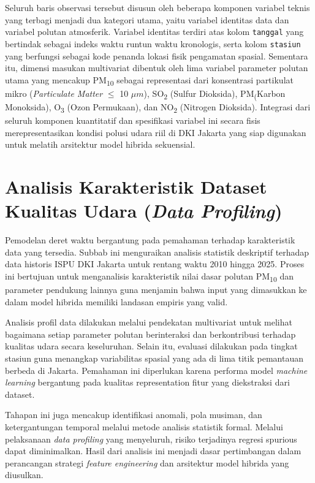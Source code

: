 Seluruh baris observasi tersebut disusun oleh beberapa komponen variabel teknis yang terbagi menjadi dua kategori utama, yaitu variabel identitas data dan variabel polutan atmosferik. Variabel identitas terdiri atas kolom \texttt{tanggal} yang bertindak sebagai indeks waktu runtun waktu kronologis, serta kolom \texttt{stasiun} yang berfungsi sebagai kode penanda lokasi fisik pengamatan spasial. Sementara itu, dimensi masukan multivariat dibentuk oleh lima variabel parameter polutan utama yang mencakup PM\textsubscript{10} sebagai representasi dari konsentrasi partikulat mikro (\textit{Particulate Matter} $\le$ 10 $\mu m$), SO\textsubscript{2} (Sulfur Dioksida), PM\textsubscript (Karbon Monoksida), O\textsubscript{3} (Ozon Permukaan), dan NO\textsubscript{2} (Nitrogen Dioksida). Integrasi dari seluruh komponen kuantitatif dan spesifikasi variabel ini secara fisis merepresentasikan kondisi polusi udara riil di DKI Jakarta yang siap digunakan untuk melatih arsitektur model hibrida sekuensial.

\section{Analisis Karakteristik Dataset Kualitas Udara (\textit{Data Profiling})}

Pemodelan deret waktu bergantung pada pemahaman terhadap karakteristik data yang tersedia. Subbab ini menguraikan analisis statistik deskriptif terhadap data historis ISPU DKI Jakarta untuk rentang waktu 2010 hingga 2025. Proses ini bertujuan untuk menganalisis karakteristik nilai dasar polutan PM\textsubscript{10} dan parameter pendukung lainnya guna menjamin bahwa input yang dimasukkan ke dalam model hibrida memiliki landasan empiris yang valid.

Analisis profil data dilakukan melalui pendekatan multivariat untuk melihat bagaimana setiap parameter polutan berinteraksi dan berkontribusi terhadap kualitas udara secara keseluruhan. Selain itu, evaluasi dilakukan pada tingkat stasiun guna menangkap variabilitas spasial yang ada di lima titik pemantauan berbeda di Jakarta. Pemahaman ini diperlukan karena performa model \textit{machine learning} bergantung pada kualitas representation fitur yang diekstraksi dari dataset.

Tahapan ini juga mencakup identifikasi anomali, pola musiman, dan ketergantungan temporal melalui metode analisis statistik formal. Melalui pelaksanaan \textit{data profiling} yang menyeluruh, risiko terjadinya regresi spurious dapat diminimalkan. Hasil dari analisis ini menjadi dasar pertimbangan dalam perancangan strategi \textit{feature engineering} dan arsitektur model hibrida yang diusulkan.

